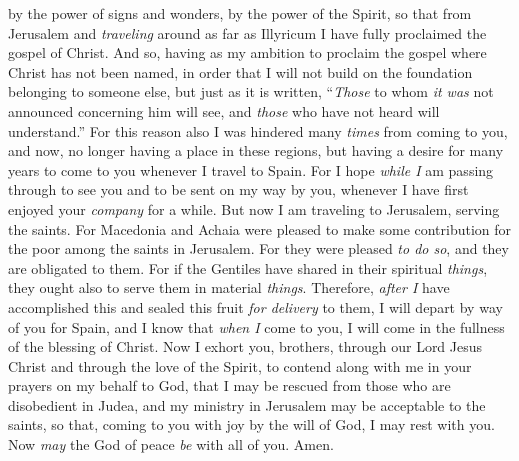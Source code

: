 \begin{biblechapter}
\verse by the power of signs and wonders, by the power of the Spirit, so that from Jerusalem and \textit{traveling} around as far as Illyricum I have fully proclaimed the gospel of Christ.
\verse And so, having as my ambition to proclaim the gospel where Christ has not been named, in order that I will not build on the foundation belonging to someone else,
\verse but just as it is written, “\textit{Those} to whom \textit{it was} not announced concerning him will see, 
and \textit{those} who have not heard will understand.”
 For this reason also I was hindered many \textit{times} from coming to you,
\verse and now, no longer having a place in these regions, but having a desire for many years to come to you
\verse whenever I travel to Spain. For I hope \textit{while I} am passing through to see you and to be sent on my way by you, whenever I have first enjoyed your \textit{company} for a while.
\verse But now I am traveling to Jerusalem, serving the saints.
\verse For Macedonia and Achaia were pleased to make some contribution for the poor among the saints in Jerusalem.
\verse For they were pleased \textit{to do so}, and they are obligated to them. For if the Gentiles have shared in their spiritual \textit{things}, they ought also to serve them in material \textit{things}.
\verse Therefore, \textit{after I} have accomplished this and sealed this fruit \textit{for delivery} to them, I will depart by way of you for Spain,
\verse and I know that \textit{when I} come to you, I will come in the fullness of the blessing of Christ.
\verse Now I exhort you, brothers, through our Lord Jesus Christ and through the love of the Spirit, to contend along with me in your prayers on my behalf to God,
\verse that I may be rescued from those who are disobedient in Judea, and my ministry in Jerusalem may be acceptable to the saints,
\verse so that, coming to you with joy by the will of God, I may rest with you.
\verse Now \textit{may} the God of peace \textit{be} with all of you. Amen.
\end{biblechapter}


